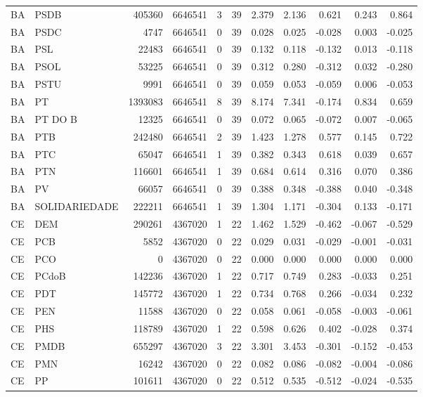 \begin{landscape}
\begin{longtable}{llrrrrrrrrr}
BA & PSDB & 405360 & 6646541 & 3 & 39 & 2.379 & 2.136 & 0.621 & 0.243 & 0.864 \\
BA & PSDC & 4747 & 6646541 & 0 & 39 & 0.028 & 0.025 & -0.028 & 0.003 & -0.025 \\
BA & PSL & 22483 & 6646541 & 0 & 39 & 0.132 & 0.118 & -0.132 & 0.013 & -0.118 \\
BA & PSOL & 53225 & 6646541 & 0 & 39 & 0.312 & 0.280 & -0.312 & 0.032 & -0.280 \\
BA & PSTU & 9991 & 6646541 & 0 & 39 & 0.059 & 0.053 & -0.059 & 0.006 & -0.053 \\
BA & PT & 1393083 & 6646541 & 8 & 39 & 8.174 & 7.341 & -0.174 & 0.834 & 0.659 \\
BA & PT DO B & 12325 & 6646541 & 0 & 39 & 0.072 & 0.065 & -0.072 & 0.007 & -0.065 \\
BA & PTB & 242480 & 6646541 & 2 & 39 & 1.423 & 1.278 & 0.577 & 0.145 & 0.722 \\
BA & PTC & 65047 & 6646541 & 1 & 39 & 0.382 & 0.343 & 0.618 & 0.039 & 0.657 \\
BA & PTN & 116601 & 6646541 & 1 & 39 & 0.684 & 0.614 & 0.316 & 0.070 & 0.386 \\
BA & PV & 66057 & 6646541 & 0 & 39 & 0.388 & 0.348 & -0.388 & 0.040 & -0.348 \\
BA & SOLIDARIEDADE & 222211 & 6646541 & 1 & 39 & 1.304 & 1.171 & -0.304 & 0.133 & -0.171 \\
CE & DEM & 290261 & 4367020 & 1 & 22 & 1.462 & 1.529 & -0.462 & -0.067 & -0.529 \\
CE & PCB & 5852 & 4367020 & 0 & 22 & 0.029 & 0.031 & -0.029 & -0.001 & -0.031 \\
CE & PCO & 0 & 4367020 & 0 & 22 & 0.000 & 0.000 & 0.000 & 0.000 & 0.000 \\
CE & PCdoB & 142236 & 4367020 & 1 & 22 & 0.717 & 0.749 & 0.283 & -0.033 & 0.251 \\
CE & PDT & 145772 & 4367020 & 1 & 22 & 0.734 & 0.768 & 0.266 & -0.034 & 0.232 \\
CE & PEN & 11588 & 4367020 & 0 & 22 & 0.058 & 0.061 & -0.058 & -0.003 & -0.061 \\
CE & PHS & 118789 & 4367020 & 1 & 22 & 0.598 & 0.626 & 0.402 & -0.028 & 0.374 \\
CE & PMDB & 655297 & 4367020 & 3 & 22 & 3.301 & 3.453 & -0.301 & -0.152 & -0.453 \\
CE & PMN & 16242 & 4367020 & 0 & 22 & 0.082 & 0.086 & -0.082 & -0.004 & -0.086 \\
CE & PP & 101611 & 4367020 & 0 & 22 & 0.512 & 0.535 & -0.512 & -0.024 & -0.535 \\

\end{longtable}
\end{landscape}
